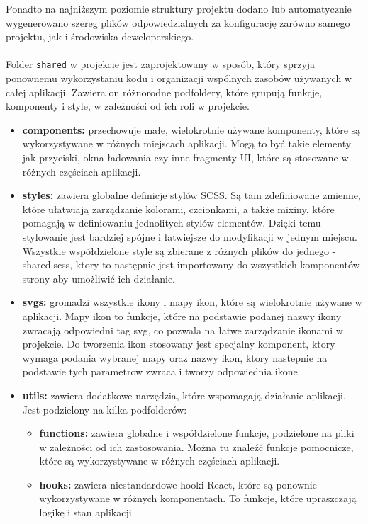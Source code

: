 \documentclass[12pt,a4paper]{article}
\begin{document}
\newpage

\noindent
Ponadto na najniższym poziomie struktury projektu dodano lub automatycznie wygenerowano szereg plików odpowiedzialnych za konfigurację zarówno samego projektu, jak i środowiska deweloperskiego.
\\\\
Folder \texttt{shared} w projekcie jest zaprojektowany w sposób, który sprzyja ponownemu wykorzystaniu kodu i organizacji wspólnych zasobów używanych w całej aplikacji. Zawiera on różnorodne podfoldery, które grupują funkcje, komponenty i style, w zależności od ich roli w projekcie.

\begin{itemize}
    \item \textbf{components:} przechowuje małe, wielokrotnie używane komponenty, które są wykorzystywane w różnych miejscach aplikacji. Mogą to być takie elementy jak  przyciski, okna ładowania czy inne fragmenty UI, które są stosowane w różnych częściach aplikacji.
    \item \textbf{styles:} zawiera globalne definicje stylów SCSS. Są tam zdefiniowane zmienne, które ułatwiają zarządzanie kolorami, czcionkami, a także mixiny, które pomagają w definiowaniu jednolitych stylów elementów. Dzięki temu stylowanie jest bardziej spójne i łatwiejsze do modyfikacji w jednym miejscu. Wszystkie współdzielone style są zbierane z różnych plików do jednego - shared.scss, ktory to następnie jest importowany do wszystkich komponentów strony aby umożliwić ich działanie.
    \item \textbf{svgs:} gromadzi wszystkie ikony i mapy ikon, które są wielokrotnie używane w aplikacji. Mapy ikon to funkcje, które na podstawie podanej nazwy ikony zwracają odpowiedni tag svg, co pozwala na łatwe zarządzanie ikonami w projekcie. Do tworzenia ikon stosowany jest specjalny komponent, ktory wymaga podania wybranej mapy oraz nazwy ikon, ktory nastepnie na podstawie tych parametrow zwraca i tworzy odpowiednia ikone.
    \item \textbf{utils:} zawiera dodatkowe narzędzia, które wspomagają działanie aplikacji. Jest podzielony na kilka podfolderów:
    \begin{itemize}
        \item \textbf{functions:} zawiera globalne i współdzielone funkcje, podzielone na pliki w zależności od ich zastosowania. Można tu znaleźć funkcje pomocnicze, które są wykorzystywane w różnych częściach aplikacji.
        \item \textbf{hooks:} zawiera niestandardowe hooki React, które są ponownie wykorzystywane w różnych komponentach. To funkcje, które upraszczają logikę i stan aplikacji.

\end{itemize}
\end{itemize}
\end{document}
